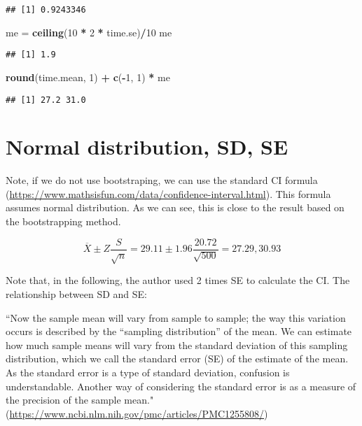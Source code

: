 \documentclass[]{book}
\newenvironment{Shaded}{\begin{snugshade}}{\end{snugshade}}
\newcommand{\DecValTok}[1]{\textcolor[rgb]{0.00,0.00,0.81}{#1}}
\newcommand{\KeywordTok}[1]{\textcolor[rgb]{0.13,0.29,0.53}{\textbf{#1}}}
\newcommand{\NormalTok}[1]{#1}
\newcommand{\OperatorTok}[1]{\textcolor[rgb]{0.81,0.36,0.00}{\textbf{#1}}}
\newcommand{\StringTok}[1]{\textcolor[rgb]{0.31,0.60,0.02}{#1}}
\begin{document}
\begin{verbatim}
## [1] 0.9243346
\end{verbatim}

\begin{Shaded}
\begin{Highlighting}[]
\NormalTok{me =}\StringTok{ }\KeywordTok{ceiling}\NormalTok{(}\DecValTok{10} \OperatorTok{*}\StringTok{ }\DecValTok{2} \OperatorTok{*}\StringTok{ }\NormalTok{time.se)}\OperatorTok{/}\DecValTok{10}
\NormalTok{me}
\end{Highlighting}
\end{Shaded}

\begin{verbatim}
## [1] 1.9
\end{verbatim}

\begin{Shaded}
\begin{Highlighting}[]
\KeywordTok{round}\NormalTok{(time.mean, }\DecValTok{1}\NormalTok{) }\OperatorTok{+}\StringTok{ }\KeywordTok{c}\NormalTok{(}\OperatorTok{-}\DecValTok{1}\NormalTok{, }\DecValTok{1}\NormalTok{) }\OperatorTok{*}\StringTok{ }\NormalTok{me}
\end{Highlighting}
\end{Shaded}

\begin{verbatim}
## [1] 27.2 31.0
\end{verbatim}

\hypertarget{normal-distribution-sd-se}{%
\section{Normal distribution, SD, SE}\label{normal-distribution-sd-se}}

Note, if we do not use bootstraping, we can use the standard CI formula (\url{https://www.mathsisfun.com/data/confidence-interval.html}). This formula assumes normal distribution. As we can see, this is close to the result based on the bootstrapping method.

\[\overline{X} \pm Z \frac{S}{\sqrt{n}}=29.11 \pm 1.96 \frac{20.72}{\sqrt{500}}=27.29, 30.93\]

Note that, in the following, the author used 2 times SE to calculate the CI. The relationship between SD and SE:

``Now the sample mean will vary from sample to sample; the way this variation occurs is described by the ``sampling distribution'' of the mean. We can estimate how much sample means will vary from the standard deviation of this sampling distribution, which we call the standard error (SE) of the estimate of the mean. As the standard error is a type of standard deviation, confusion is understandable. Another way of considering the standard error is as a measure of the precision of the sample mean." (\url{https://www.ncbi.nlm.nih.gov/pmc/articles/PMC1255808/})
\end{document}
